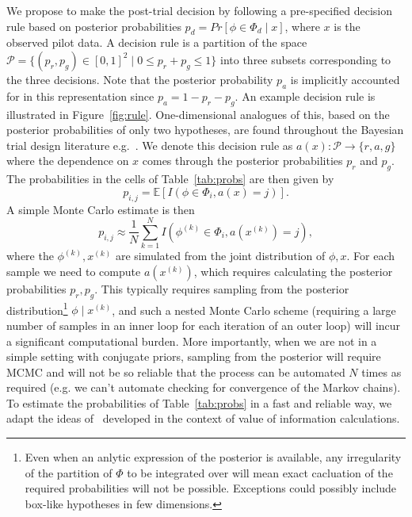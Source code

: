 \documentclass{article} %
\begin{document}
We propose to make the post-trial decision by following a pre-specified decision rule based on posterior probabilities $p_{d} = Pr[\phi \in \Phi_{d} \mid x]$, where $x$ is the observed pilot data. A decision rule is a partition of the space $\mathcal{P} = \{(p_{r}, p_{g}) \in [0,1]^{2} \mid 0 \leq p_{r} + p_{g} \leq 1 \}$ into three subsets corresponding to the three decisions. Note that the posterior probability $p_{a}$ is implicitly accounted for in this representation since $p_{a} = 1-p_{r}-p_{g}$. An example decision rule is illustrated in Figure~\ref{fig:rule}. One-dimensional analogues of this, based on the posterior probabilities of only two hypotheses, are found throughout the Bayesian trial design literature e.g.~\cite{Ibrahim2014}. We denote this decision rule as $a(x): \mathcal{P}  \rightarrow \{r, a, g\}$ where the dependence on $x$ comes through the posterior probabilities $p_{r}$ and $p_{g}$. The probabilities in the cells of Table~\ref{tab:probs} are then given by
\begin{equation}
p_{i,j} = \mathbb{E} [ I(\phi \in \Phi_{i}, a(x) = j) ].
\end{equation}
A simple Monte Carlo estimate is then
\begin{equation} \label{eqn:MC_prob}
p_{i,j} \approx \frac{1}{N} \sum_{k=1}^{N} I(\phi^{(k)} \in \Phi_{i}, a(x^{(k)}) = j),
\end{equation}
where the $\phi^{(k)}, x^{(k)}$ are simulated from the joint distribution of $\phi, x$. For each sample we need to compute $a(x^{(k)})$, which requires calculating the posterior probabilities $p_{r}, p_{g}$. This typically requires sampling from the posterior distribution\footnote{Even when an anlytic expression of the posterior is available, any irregularity of the partition of $\Phi$ to be integrated over will mean exact cacluation of the required probabilities will not be possible. Exceptions could possibly include box-like hypotheses in few dimensions.} $\phi \mid x^{(k)}$, and such a nested Monte Carlo scheme (requiring a large number of samples in an inner loop for each iteration of an outer loop) will incur a significant computational burden. More importantly, when we are not in a simple setting with conjugate priors, sampling from the posterior will require MCMC and will not be so reliable that the process can be automated $N$ times as required (e.g. we can't automate checking for convergence of the Markov chains). To estimate the probabilities of Table~\ref{tab:probs} in a fast and reliable way, we adapt the ideas of~\cite{Strong2015} developed in the context of value of information calculations.
\end{document}

